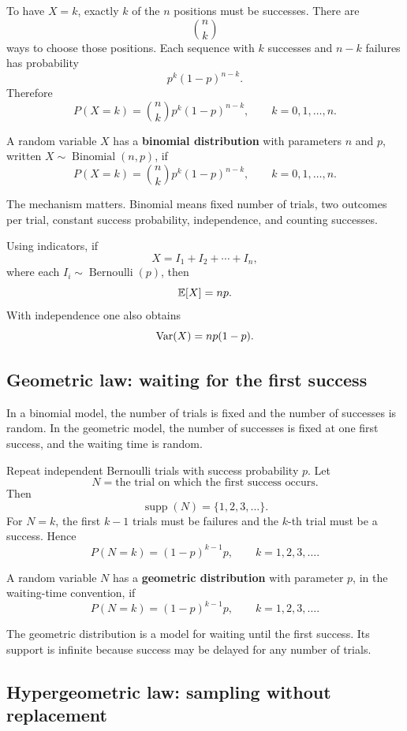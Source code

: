 To have \(X=k\), exactly \(k\) of the \(n\) positions must be successes. There
are
\[
\binom nk
\]
ways to choose those positions. Each sequence with \(k\) successes and \(n-k\)
failures has probability
\[
p^k(1-p)^{n-k}.
\]
Therefore
\[
P(X=k)=\binom nk p^k(1-p)^{n-k},\qquad k=0,1,\ldots,n.
\]

\begin{definitionbox}
A random variable \(X\) has a \textbf{binomial distribution} with parameters
\(n\) and \(p\), written \(X\sim\operatorname{Binomial}(n,p)\), if
\[
P(X=k)=\binom nk p^k(1-p)^{n-k},\qquad k=0,1,\ldots,n.
\]
\end{definitionbox}

The mechanism matters. Binomial means fixed number of trials, two outcomes per
trial, constant success probability, independence, and counting successes.

Using indicators, if
\[
X=I_1+I_2+\cdots+I_n,
\]
where each \(I_i\sim\operatorname{Bernoulli}(p)\), then
\[
\mathbb{E}[X]=np.
\]
With independence one also obtains
\[
\operatorname{Var}(X)=np(1-p).
\]

\subsection*{Geometric law: waiting for the first success}

In a binomial model, the number of trials is fixed and the number of successes is
random. In the geometric model, the number of successes is fixed at one first
success, and the waiting time is random.

Repeat independent Bernoulli trials with success probability \(p\). Let
\[
N=\text{the trial on which the first success occurs}.
\]
Then
\[
\operatorname{supp}(N)=\{1,2,3,\ldots\}.
\]
For \(N=k\), the first \(k-1\) trials must be failures and the \(k\)-th trial
must be a success. Hence
\[
P(N=k)=(1-p)^{k-1}p,\qquad k=1,2,3,\ldots.
\]

\begin{definitionbox}
A random variable \(N\) has a \textbf{geometric distribution} with parameter
\(p\), in the waiting-time convention, if
\[
P(N=k)=(1-p)^{k-1}p,\qquad k=1,2,3,\ldots.
\]
\end{definitionbox}

The geometric distribution is a model for waiting until the first success. Its
support is infinite because success may be delayed for any number of trials.

\subsection*{Hypergeometric law: sampling without replacement}


